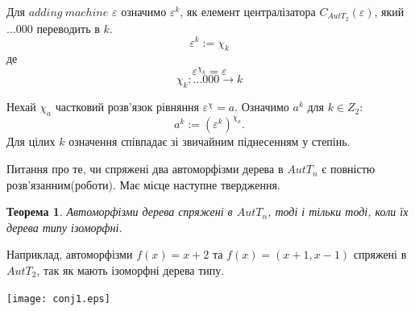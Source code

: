 \documentclass[a4paper,12pt]{article} \usepackage{a4wide}
\numberwithin{equation}{subsection}
\newtheorem{theorem}{Теорема}[subsection]
\begin{document}
Для $adding\ machine$ $\varepsilon$ означимо $\varepsilon^k$, як елемент централізатора $C_{AutT_2}(\varepsilon)$,
 який $...000$ переводить в $k$.
 $$\varepsilon^k:=\chi_k$$
 де
 $$\varepsilon^{\chi_k}=\varepsilon$$
 $$\chi_k:...000\rightarrow k$$

 Нехай $\chi_a$ частковий розв'язок рівняння $\varepsilon^{\chi}=a$.
 Означимо $a^k$ для $k \in Z_2$:
 $$a^k:=(\varepsilon^k)^{\chi_a}.$$
 Для цілих $k$ означення співпадає зі звичайним піднесенням у степінь.

Питання про те, чи спряжені два автоморфізми дерева в  $AutT_n$ є повністю розв'язанним(роботи). Має місце наступне твердження.
 \begin{theorem}
Автоморфізми дерева спряжені в $AutT_n$, тоді і тільки тоді, коли їх дерева типу ізоморфні.
\end{theorem}
Наприклад, автоморфізми $f(x)=x+2$ та $f(x)=(x+1,x-1)$ спряжені в $AutT_2$, так як мають ізоморфні дерева типу.
\begin{center}
\texttt{[image: conj1.eps]}
\end{center}
\end{document}
